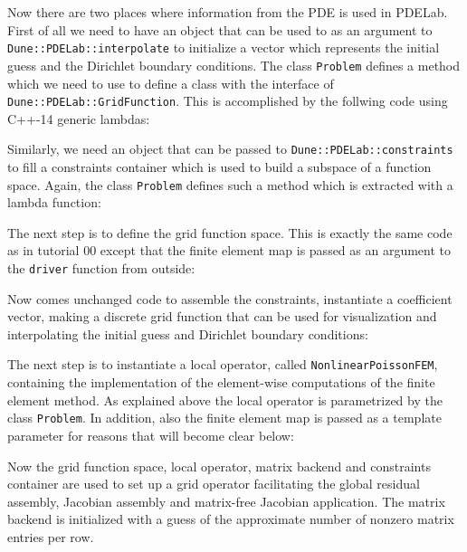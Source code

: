 \documentclass[a4paper,12pt]{article}
\begin{document}
Now there are two places where information from the PDE is used
in PDELab. First of all we need to have an object that can be used to
as an argument to \lstinline{Dune::PDELab::interpolate} to
initialize a vector which represents the initial guess and the Dirichlet boundary conditions.
The class \lstinline{Problem} defines a method which we need to use
to define a class with the interface of \lstinline{Dune::PDELab::GridFunction}.
This is accomplished by the follwing code using C++-14 generic lambdas:


Similarly, we need an object that can be passed to 
\lstinline{Dune::PDELab::constraints} to fill a constraints container which
is used to build a subspace of a function space. Again, the
class \lstinline{Problem} defines such a method which is extracted with
a lambda function:


The next step is to define the grid function space. This is
exactly the same code as in tutorial 00 except that the finite element
map is passed as an argument to the \lstinline{driver} function from outside:


Now comes unchanged code to assemble the constraints,
instantiate a coefficient vector, making a discrete grid function that can be
used for visualization and interpolating the initial guess and Dirichlet boundary 
conditions:


The next step is to instantiate a local operator, called \lstinline{NonlinearPoissonFEM},
containing the implementation of the element-wise computations of the finite element
method. As explained above the local operator is parametrized by the class 
\lstinline{Problem}. In addition, also the finite element map is passed as a template
parameter for reasons that will become clear below:


Now the grid function space, local operator, matrix backend and
constraints container are used to set up a grid operator facilitating
the global residual assembly, Jacobian assembly and matrix-free Jacobian application.
The matrix backend is initialized with a guess of the approximate number
of nonzero matrix entries per row.

\end{document}
